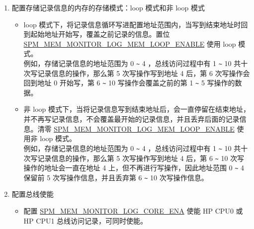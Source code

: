 \documentclass[main\_\_CN.tex]{subfiles}
\begin{document}
\begin{enumerate}
        \begin{itemize}
            \item \hyperref[regdesc:SPMMEMMONITORLOGMEMSTARTREG]{SPM\_MEM\_MONITOR\_LOG\_MEM\_START\_REG} 和 \hyperref[regdesc:SPMMEMMONITORLOGMEMENDREG]{SPM\_MEM\_MONITOR\_LOG\_MEM\_END\_REG} 为存储地址范围配置寄存器。 记录信息的存储地址范围为 0x4FF0\_0000 \verb+~+ 0x4FFB\_FFFF。
            \item 置位 \hyperref[regdesc:SPMMEMMONITORLOGMEMADDRUPDATEREG]{SPM\_MEM\_MONITOR\_LOG\_MEM\_ADDR\_UPDATE\_REG}，使 \hyperref[regdesc:SPMMEMMONITORLOGMEMCURRENTADDRREG]{SPM\_MEM\_MONITOR\_LOG\_MEM\_CURRENT\_ADDR\_REG} 更新为 \hyperref[regdesc:SPMMEMMONITORLOGMEMSTARTREG]{SPM\_MEM\_MONITOR\_LOG\_MEM\_START\_REG}。
            \item 配置辅助调试模块的 SPM 监控功能对 HP L2MEM 的使用权限，只有开启了辅助调试模块对 HP L2MEM 的使用权限才能访问 HP L2MEM。关于如何配置，详情见章节 \ref{mod:permctrl} \textit{}) 的 \hyperref[regdesc:PMSDMASPMMONPMSWREG]{PMS\_DMA\_SPM\_MON\_PMS\_W\_REG} 及相关内容。
        \end{itemize}
    \item \label{other:dbgassist-item-log-config-step5} 配置存储记录信息的内存的存储模式：loop 模式和非 loop 模式
        \begin{itemize}
            \item loop 模式下，将记录信息循环写进配置地址范围内，当写到结束地址时回到起始地址开始写，覆盖之前记录的信息。置位 \hyperref[fielddesc:SPMMEMMONITORLOGMEMLOOPENABLE]{SPM\_MEM\_MONITOR\_LOG\_MEM\_LOOP\_ENABLE} 使用 loop 模式。\\
            例如，存储记录信息的地址范围为 0 \verb+~+ 4 ，总线访问过程中有 1 \verb+~+ 10 共十次写记录信息的操作，那么第 5 次写操作写到地址 4 后，第 6 次写操作会回到地址 0 开始写，第 6 \verb+~+ 10 写操作会覆盖之前的第 1 \verb+~+ 5 写操作的数据。
            \item 非 loop 模式下，当将记录信息写到结束地址后，会一直停留在结束地址，并不再写记录信息，不会覆盖最开始的记录信息，并且丢弃后面的记录信息。清零 \hyperref[fielddesc:SPMMEMMONITORLOGMEMLOOPENABLE]{SPM\_MEM\_MONITOR\_LOG\_MEM\_LOOP\_ENABLE} 使用非 loop 模式。\\
            例如，存储记录信息的地址范围为 0 \verb+~+ 4 ，总线访问过程中有 1 \verb+~+ 10 共十次写记录信息的操作，那么第 5 次写操作写到地址 4 后，第 6 \verb+~+ 10 次写操作的地址会一直在地址 4 上，但不再进行写操作，因此地址范围 0 \verb+~+ 4 保留前 5 次写操作信息，并且丢弃第 6 \verb+~+ 10 次写操作信息。
        \end{itemize}
     \item 配置总线使能
        \begin{itemize}
            \item 配置 \hyperref[fielddesc:SPMMEMMONITORLOGCOREENA]{SPM\_MEM\_MONITOR\_LOG\_CORE\_ENA} 使能 HP CPU0 或 HP CPU1 总线访问记录，可同时使能。
        \end{itemize}
\end{enumerate}
\end{document}
